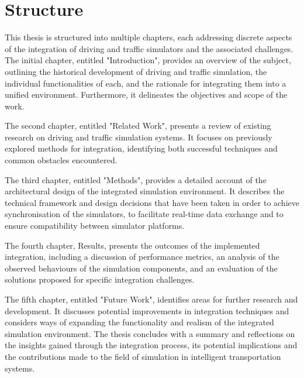 \section{Structure}\label{sec:structure}
    This thesis is structured into multiple chapters, each addressing discrete aspects of the integration of driving and traffic simulators and the associated challenges.\\

    The initial chapter, entitled "Introduction", provides an overview of the subject, outlining the historical development of driving and traffic simulation, the individual functionalities of each, and the rationale for integrating them into a unified environment.
    Furthermore, it delineates the objectives and scope of the work.

    The second chapter, entitled "Related Work", presents a review of existing research on driving and traffic simulation systems.
    It focuses on previously explored methods for integration, identifying both successful techniques and common obstacles encountered.

    The third chapter, entitled "Methods", provides a detailed account of the architectural design of the integrated simulation environment.
    It describes the technical framework and design decisions that have been taken in order to achieve synchronisation of the simulators, to facilitate real-time data exchange and to ensure compatibility between simulator platforms.

    The fourth chapter, Results, presents the outcomes of the implemented integration, including a discussion of performance metrics, an analysis of the observed behaviours of the simulation components, and an evaluation of the solutions proposed for specific integration challenges.

    The fifth chapter, entitled "Future Work", identifies areas for further research and development.
    It discusses potential improvements in integration techniques and considers ways of expanding the functionality and realism of the integrated simulation environment.
    The thesis concludes with a summary and reflections on the insights gained through the integration process, its potential implications and the contributions made to the field of simulation in intelligent transportation systems.

